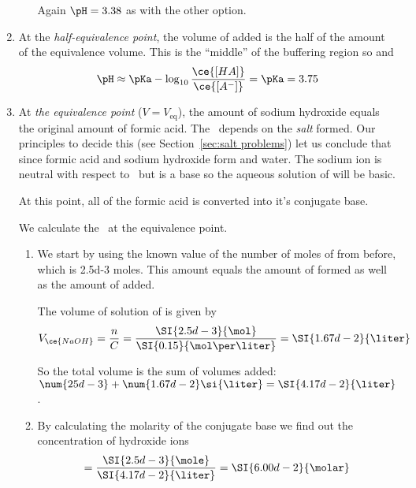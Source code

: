 \documentclass[../mit-general-chemistry.tex]{subfiles}
\begin{document}
\begin{example}
\begin{enumerate}[label=\arabic*)]
\begin{enumerate}[label=Option \arabic*)]
      Again $\pH = 3.38$ as with the other option.
    \end{enumerate}

  \item At the {\em half-equivalence point}, the volume of 
    added is the half of the amount of the equivalence volume. This is
    the ``middle'' of the buffering region so \ce{[HA] = [A^-]} and
    \begin{equation*}
      \pH \approx \pKa - \log_{10}\frac{\ce{[HA]}}{\ce{[A^-]}}
      = \pKa = 3.75
    \end{equation*}

  \item At {\em the equivalence point} ($V = V_{\text{eq}}$), the
    amount of sodium hydroxide equals the original amount of formic
    acid. The \pH\ depends on the {\em salt} formed. Our principles to
    decide this (see Section~\ref{sec:salt problems}) let us conclude
    that since formic acid and sodium hydroxide form  and
    water. The sodium ion is neutral with respect to \pH\ but
     is a base so the aqueous solution of  will
    be basic.

    At this point, all of the formic acid is converted into it's
    conjugate base.

    We calculate the \pH\ at the equivalence point.
    \begin{enumerate}[label=\roman*)]
    \item We start by using the known value of the number of moles of
       from before, which is \num{2.5d-3} moles. This amount
      equals the amount of  formed as well as the amount of
      \hydroxide added.

      The volume of solution of  is given by
      \begin{equation*}
        V_{\ce{NaOH}} = \frac{n}{C}
        = \frac{\SI{2.5d-3}{\mol}}{\SI{0.15}{\mol\per\liter}}
        = \SI{1.67d-2}{\liter}
      \end{equation*}

      So the total volume is the sum of volumes added:
      $\num{25d-3} + \num{1.67d-2} \si{\liter}=
      \SI{4.17d-2}{\liter}$.

    \item By calculating the molarity of the conjugate base we find
      out the concentration of hydroxide ions
      \begin{equation*}
        [\hydroxide]
        = \frac{\SI{2.5d-3}{\mole}}{\SI{4.17d-2}{\liter}}
        = \SI{6.00d-2}{\molar}
      \end{equation*}


\end{enumerate}
\end{enumerate}
\end{example}
\end{document}
